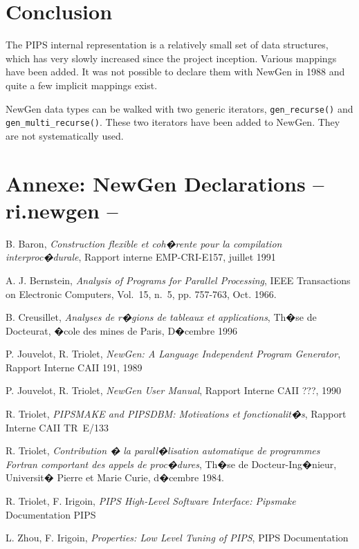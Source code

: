 \documentclass[a4paper]{article}
\begin{document}
\section{Conclusion}

The PIPS internal representation is a relatively small set of data
structures, which has very slowly increased since the project inception.
Various mappings have been added. It was not possible to declare them
with NewGen in 1988 and quite a few implicit mappings exist.

NewGen data types can be walked with two generic iterators,
\verb/gen_recurse()/ and \verb/gen_multi_recurse()/. These two iterators
have been added to NewGen. They are not systematically used.

\newpage

\section*{Annexe: NewGen Declarations -- ri.newgen --}


\newpage

\begin{thebibliography}{9}

 B. Baron,
\emph{Construction flexible et coh�rente pour la compilation
interproc�durale}, 
Rapport interne EMP-CRI-E157, juillet 1991

 A. J. Bernstein, \emph{Analysis of Programs for
Parallel Processing}, IEEE Transactions on Electronic Computers,
Vol.~15, n.~5, pp. 757-763, Oct. 1966.

 B. Creusillet,
\emph{Analyses de r�gions de tableaux et applications}, Th�se de
Docteurat, �cole des mines de Paris, D�cembre 1996

 P. Jouvelot, R. Triolet,
\emph{NewGen: A Language Independent Program Generator},
Rapport Interne CAII 191, 1989

 P. Jouvelot, R. Triolet,
\emph{NewGen User Manual},
Rapport Interne CAII ???, 1990

 R. Triolet,
\emph{PIPSMAKE and PIPSDBM: Motivations et fonctionalit�s},
Rapport Interne CAII TR~E/133

 R. Triolet,
\emph{Contribution � la parall�lisation automatique de programmes
Fortran comportant des appels de proc�dures}, Th�se de
Docteur-Ing�nieur, Universit� Pierre et Marie Curie, d�cembre 1984.

 R. Triolet,  F. Irigoin,
\emph{PIPS High-Level Software Interface: Pipsmake}
Documentation PIPS

 L. Zhou, F. Irigoin,
\emph{Properties: Low Level Tuning of PIPS},
PIPS Documentation

\end{thebibliography}




\printindex
\end{document}
